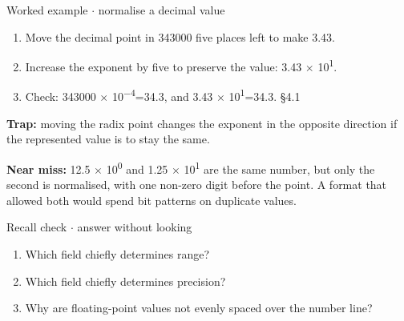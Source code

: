 \documentclass[11pt]{article}
\begin{document}
\begin{keepsection}
\begin{keepsection}
\begin{workedbox}{Worked example \ensuremath{\cdot} normalise a decimal value}
\begin{enumerate}
\item Move the decimal point in 343000 five places left to make 3.43.
\item Increase the exponent by five to preserve the value: 3.43 \ensuremath{\times} 10\textsuperscript{1}.
\item Check: 343000 \ensuremath{\times} 10\textsuperscript{\ensuremath{-}4}=34.3, and 3.43 \ensuremath{\times} 10\textsuperscript{1}=34.3. \hfill{\small\color{FAUblue}§4.1}
\end{enumerate}
\end{workedbox}

\begin{notebox}\textbf{Trap:} moving the radix point changes the exponent in the opposite direction if the represented value is to stay the same.\end{notebox}

\begin{notebox}\textbf{Near miss:} 12.5 \ensuremath{\times} 10\textsuperscript{0} and 1.25 \ensuremath{\times} 10\textsuperscript{1} are the same number, but only the second is normalised, with one non-zero digit before the point. A format that allowed both would spend bit patterns on duplicate values.\end{notebox}

\begin{recallbox}{Recall check \ensuremath{\cdot} answer without looking}
\begin{enumerate}
\item Which field chiefly determines range?
\item Which field chiefly determines precision?
\item Why are floating-point values not evenly spaced over the number line?
\end{enumerate}

\end{recallbox}
\end{keepsection}
\end{keepsection}
\end{document}
